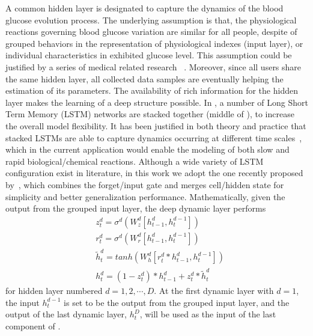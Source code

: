 A common hidden layer is designated to capture the dynamics of the blood glucose evolution process.
The underlying assumption is that, the physiological reactions governing blood glucose variation are similar for all people, despite of grouped behaviors in the representation of physiological indexes (input layer), or individual characteristics in exhibited glucose level.
This assumption could be justified by a series of medical related research~\cite{bib:lehmann1992physiological} \cite{bib:TBE07:Dalla} \cite{bib:PE04:Hovorka} \cite{bib:duke2010intelligent}.
Moreover, since all users share the same hidden layer, all collected data samples are eventually helping the estimation of its parameters.
The availability of rich information for the hidden layer makes the learning of a deep structure possible.
In \sysname, a number of Long Short Term Memory (LSTM) networks are stacked together (middle of ), to increase the overall model flexibility.
It has been justified in both theory and practice that stacked LSTMs are able to capture dynamics occurring at different time scales~\cite{dyer2015transition}, which in the current application would enable the modeling of both slow and rapid biological/chemical reactions.
Although a wide variety of LSTM configuration exist in literature, in this work we adopt the one recently proposed by~\cite{koutnik2014clockwork}, which combines the forget/input gate and merges cell/hidden state for simplicity and better generalization performance.
Mathematically, given the output from the grouped input layer, the deep dynamic layer performs
\begin{equation}
\begin{aligned}
&z^d_t = \sigma^d\left( W^d_z [h_{t-1}^d,h_t^{d-1}] \right) \\
&r^d_t = \sigma^d\left( W^d_r [h_{t-1}^d,h_t^{d-1}] \right) \\
&\tilde{h}_t^d = tanh\left( W^d_h [r_t^d*h_{t-1}^d,h_t^{d-1}] \right) \\
&h^d_t = (1-z_t^d)*h_{t-1}^d + z_t^d*\tilde{h}_t^d
\end{aligned}
\end{equation}
for hidden layer numbered $d = 1,2,\cdots,D$. At the first dynamic layer with $d=1$, the input $h_t^{d-1}$ is set to be the output from the grouped input layer, and the output of the last dynamic layer, $h^D_t$, will be used as the input of the last component of \modelname.

